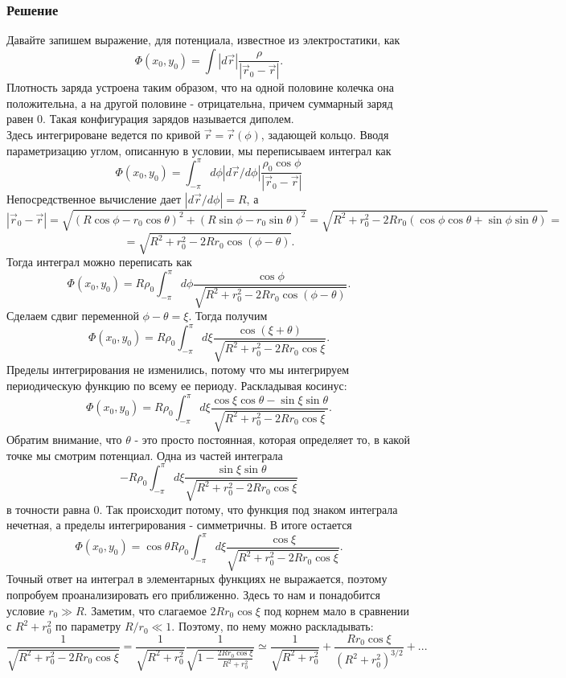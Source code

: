 \documentclass[a4paper,12pt]{article}
\begin{document}
\subsubsection*{Решение}
Давайте запишем выражение, для потенциала, известное из электростатики, как
$$
\Phi(x_{0},y_{0})	=\int|d\vec{r}|\frac{\rho}{|\vec{r}_{0}-\vec{r}|}.
$$
Плотность заряда устроена таким образом, что на одной половине колечка она положительна, а на другой половине - отрицательна, причем суммарный заряд равен 0. Такая конфигурация зарядов называется диполем.\\
Здесь интегрироване ведется по кривой $\vec{r}=\vec{r}(\phi)$, задающей кольцо. Вводя параметризацию углом, описанную в условии, мы переписываем интеграл как
$$\Phi(x_{0},y_{0})	=\int_{-\pi}^{\pi}d\phi|d\vec{r}/d\phi|\frac{\rho_{0}\cos\phi}{|\vec{r}_{0}-\vec{r}|}$$
Непосредственное вычисление дает $|d\vec{r}/d\phi|	=R$,
а
$$
|\vec{r}_{0}-\vec{r}|	=\sqrt{(R\cos\phi-r_{0}\cos\theta)^{2}+(R\sin\phi-r_{0}\sin\theta)^{2}}=\sqrt{R^{2}+r_{0}^{2}-2Rr_{0}(\cos\phi\cos\theta+\sin\phi\sin\theta)}=
$$
$$
	=\sqrt{R^{2}+r_{0}^{2}-2Rr_{0}\cos(\phi-\theta)}.
$$
Тогда интеграл можно переписать как
$$
\Phi(x_{0},y_{0})	=R\rho_{0}\int_{-\pi}^{\pi}d\phi\frac{\cos\phi}{\sqrt{R^{2}+r_{0}^{2}-2Rr_{0}\cos(\phi-\theta)}}.
$$
Сделаем сдвиг переменной $\phi-\theta=\xi$. Тогда получим
$$
\Phi(x_{0},y_{0})	=R\rho_{0}\int_{-\pi}^{\pi}d\xi\frac{\cos(\xi+\theta)}{\sqrt{R^{2}+r_{0}^{2}-2Rr_{0}\cos\xi}}.
$$
Пределы интегрирования не изменились, потому что мы интегрируем периодическую функцию по всему ее периоду. Раскладывая косинус:
$$
\Phi(x_{0},y_{0})	=R\rho_{0}\int_{-\pi}^{\pi}d\xi\frac{\cos\xi\cos\theta-\sin\xi\sin\theta}{\sqrt{R^{2}+r_{0}^{2}-2Rr_{0}\cos\xi}}.
$$
Обратим внимание, что $\theta$ - это просто постоянная, которая определяет то, в какой точке мы смотрим потенциал. Одна из частей интеграла 
$$
-R\rho_{0}\int_{-\pi}^{\pi}d\xi\frac{\sin\xi\sin\theta}{\sqrt{R^{2}+r_{0}^{2}-2Rr_{0}\cos\xi}}	
$$
в точности равна 0. Так происходит потому, что функция под знаком интеграла нечетная, а пределы интегрирования - симметричны. В итоге остается
$$
\Phi(x_{0},y_{0})	=\cos\theta R\rho_{0}\int_{-\pi}^{\pi}d\xi\frac{\cos\xi}{\sqrt{R^{2}+r_{0}^{2}-2Rr_{0}\cos\xi}}.
$$
Точный ответ на интеграл в элементарных функциях не выражается, поэтому попробуем проанализировать его приближенно. Здесь то нам и понадобится условие $r_{0}\gg R$. Заметим, что слагаемое $2Rr_{0}\cos\xi$ под корнем мало в сравнении с $R^{2}+r_{0}^{2}$ по параметру $R/r_{0}\ll 1$. Поэтому, по нему можно раскладывать:
$$
\frac{1}{\sqrt{R^{2}+r_{0}^{2}-2Rr_{0}\cos\xi}}	=\frac{1}{\sqrt{R^{2}+r_{0}^{2}}}\frac{1}{\sqrt{1-\frac{2Rr_{0}\cos\xi}{R^{2}+r_{0}^{2}}}}\simeq\frac{1}{\sqrt{R^{2}+r_{0}^{2}}}+\frac{Rr_{0}\cos\xi}{\left(R^{2}+r_{0}^{2}\right)^{3/2}}+...$$
\end{document}
